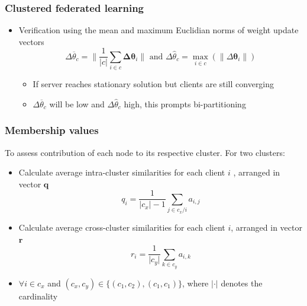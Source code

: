 \documentclass[aspectratio=169]{beamer}
\begin{document}
\begin{frame}
    \frametitle{Clustered federated learning}
\begin{itemize}
   

    \item Verification using the mean and maximum Euclidian norms of weight update vectors
    \begin{equation}
        \Delta \overline \theta_c = \Big \lVert \frac 1 {\lvert c \rvert} \sum_{i\in c} \pmb \Delta \pmb \theta_i \Big \rVert
        \text{ and }
        \Delta \hat \theta_c = \max_{i \in c}(\lVert \Delta \pmb \theta_i \rVert)
    \end{equation}
    \begin{itemize}
        \item If server reaches stationary solution but clients are still converging
        \item $\Delta \overline \theta_c$ will be low and $\Delta \hat \theta_c$ high, this prompts bi-partitioning 
    \end{itemize}
\end{itemize}
\end{frame}

\begin{frame}

\frametitle{Membership values}
    To assess contribution of each node to its respective cluster. For two clusters:
    \begin{itemize}
        \item Calculate average intra-cluster similarities for each client $i$ , arranged in vector $\pmb q$ 
        \begin{equation}
            q_i = \frac 1 {\lvert c_x \rvert - 1}\sum_{j \in c_x/i}a_{i,j}
        \end{equation}
        \item Calculate average cross-cluster similarities for each client $i$, arranged in vector $\pmb r$ 
        \begin{equation}
            r_i = \frac 1 {\lvert c_y \rvert}\sum_{k \in c_y}a_{i,k}
        \end{equation}
        \item $\forall i \in c_x$  and $(c_x, c_y) \in \{ (c_1, c_2), (c_1, c_1) \}$, where $\lvert \cdot \rvert$ denotes the cardinality
    \end{itemize}
    
\end{frame}
\end{document}
